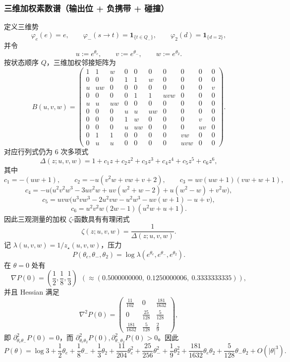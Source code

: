 \subsubsection{三维加权素数谱（输出位 + 负携带 + 碰撞）}
定义三维势
\[
\varphi_e(e)=e,\qquad
\varphi_-(s\to t)=\mathbf{1}_{\{t\in Q_-\}},\qquad
\varphi_2(d)=\mathbf{1}_{\{d=2\}},
\]
并令
\[
u:=e^{\theta_e},\qquad v:=e^{\theta_-},\qquad w:=e^{\theta_2}.
\]
按状态顺序 $Q$，三维加权邻接矩阵为
\[
B(u,v,w)=
\begin{pmatrix}
1 & 1 & w & 0 & 0 & 0 & 0 & 0 & 0 & 0\\
0 & 0 & 0 & 1 & 1 & w & 0 & 0 & 0 & 0\\
u & uw & 0 & 0 & 0 & 0 & 0 & 0 & 0 & v\\
0 & 0 & 0 & 0 & 1 & 1 & uvw & 0 & 0 & 0\\
u & u & uw & 0 & 0 & 0 & 0 & 0 & 0 & 0\\
0 & 0 & 0 & u & u & uw & 0 & 0 & 0 & 0\\
0 & 0 & 0 & 1 & w & 0 & 0 & 0 & v & 0\\
0 & 0 & 0 & u & uw & 0 & 0 & 0 & uv & 0\\
0 & 1 & 1 & 0 & 0 & 0 & 0 & vw & 0 & 0\\
0 & u & u & 0 & 0 & 0 & 0 & uvw & 0 & 0
\end{pmatrix}.
\]
对应行列式仍为 6 次多项式
\[
\Delta(z;u,v,w)=1+c_1z+c_2z^2+c_3z^3+c_4z^4+c_5z^5+c_6z^6,
\]
其中
\[
c_1=-(uw+1),\qquad
c_2=-u(v^2w+vw+v+2),\qquad
c_3=uv(uw+1)(vw+w+1),
\]
\[
c_4=-u\bigl(u^2v^2w^3-3uv^2w+uv(w^2+w-2)+u(w^2-w)+v^2w\bigr),
\]
\[
c_5=uvw\bigl(u^3 v w^3-2u^2 v w-u^2 w^3-u v(w+1)-u+v\bigr),
\]
\[
c_6=u^2 v^2 w(2w-1)(u^2w+u+1).
\]
因此三观测量的加权 $\zeta$-函数具有有理闭式
\[
\zeta(z;u,v,w)=\frac{1}{\Delta(z;u,v,w)}.
\]
记 $\lambda(u,v,w)=1/z_\star(u,v,w)$，压力
\[
P(\theta_e,\theta_-,\theta_2)=\log\lambda(e^{\theta_e},e^{\theta_-},e^{\theta_2}).
\]
在 $\theta=0$ 处有
\[
\nabla P(0)=\left(\frac12,\frac18,\frac13\right)
\ \ (\approx (0.5000000000,\ 0.1250000006,\ 0.3333333335)),
\]
并且 Hessian 满足
\[
\nabla^2P(0)=
\begin{pmatrix}
\frac{11}{102} & 0 & \frac{181}{1632}\\
0 & \frac{25}{128} & \frac{5}{128}\\
\frac{181}{1632} & \frac{5}{128} & \frac{2}{9}
\end{pmatrix},
\]
即 $\partial^2_{\theta_e\theta_-}P(0)=0$，而 $\partial^2_{\theta_e\theta_2}P(0),\partial^2_{\theta_-\theta_2}P(0)>0$。因此
\[
P(\theta)=\log 3+\frac12\theta_e+\frac18\theta_-+\frac13\theta_2
+\frac{11}{204}\theta_e^2+\frac{25}{256}\theta_-^2+\frac19\theta_2^2
+\frac{181}{1632}\theta_e\theta_2+\frac{5}{128}\theta_-\theta_2+O(|\theta|^3).
\]
